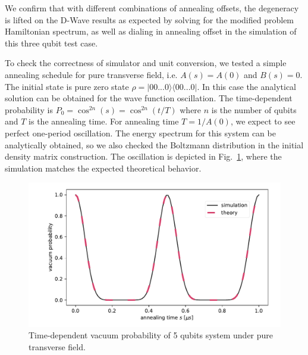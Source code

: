 \documentclass[10pt]{iopart}
\begin{document}
We confirm that with different combinations of annealing offsets, the degeneracy is lifted on the D-Wave results as expected by solving for the modified problem Hamiltonian spectrum, as well as dialing in annealing offset in the simulation of this three qubit test case.


To check the correctness of simulator and unit conversion, we tested a simple annealing schedule for pure transverse field, i.e. $A(s)=A(0)$ and $B(s)=0$.
The initial state is pure zero state $\rho=|00...0\rangle \langle 00...0|$.
In this case the analytical solution can be obtained for the wave function oscillation.
The time-dependent probability is $P_{0}=\cos^{2n}(s)=\cos^{2n}(t/T)$ where $n$ is the number of qubits and $T$ is the annealing time.
For annealing time $T=1/A(0)$, we expect to see perfect one-period oscillation. The energy spectrum for this system can be analytically obtained, so we also checked the Boltzmann distribution in the initial density matrix construction. The oscillation is depicted in Fig.~\ref{figcheck}, where the simulation matches the expected theoretical behavior.


\begin{figure}
	\centering
	\includegraphics[width=\columnwidth]{./new_figures/vacuum_probability.pdf}
	\caption{Time-dependent vacuum probability of 5 qubits system under pure transverse field.}
	\label{figcheck}
\end{figure}
\end{document}
